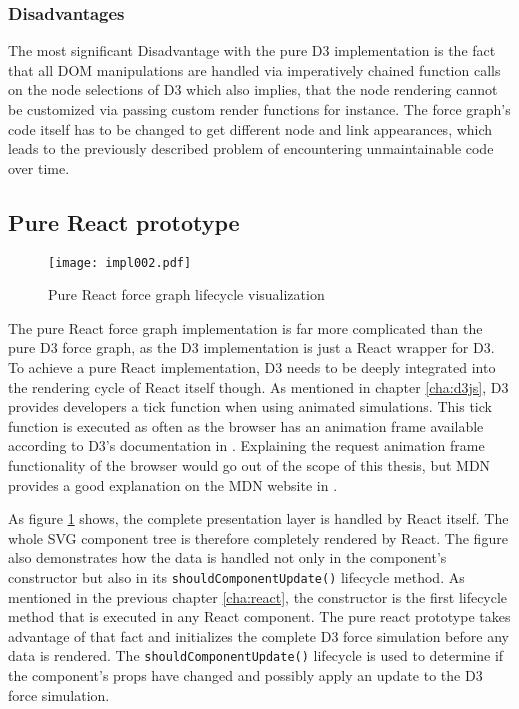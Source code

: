 \subsubsection{Disadvantages}

The most significant Disadvantage with the pure D3 implementation is the fact that all DOM manipulations are handled via imperatively chained function calls on the node selections of D3 which also implies, that the node rendering cannot be customized via passing custom render functions for instance. The force graph's code itself has to be changed to get different node and link appearances, which leads to the previously described problem of encountering unmaintainable code over time.


\subsection{Pure React prototype}

\begin{figure}
\centering
\texttt{[image: impl002.pdf]}
\caption{Pure React force graph lifecycle visualization}
\label{fig:pureReactLifecycle}
\end{figure}

The pure React force graph implementation is far more complicated than the pure D3 force graph, as the D3 implementation is just a React wrapper for D3. To achieve a pure React implementation, D3 needs to be deeply integrated into the rendering cycle of React itself though. As mentioned in chapter \ref{cha:d3js}, D3 provides developers a tick function when using animated simulations. This tick function is executed as often as the browser has an animation frame available according to D3's documentation in \cite[/d3-timer/blob/master/README.md]{D3Github}. Explaining the request animation frame functionality of the browser would go out of the scope of this thesis, but MDN provides a good explanation on the MDN website in \cite{RAF}.

As figure \ref{fig:pureReactLifecycle} shows, the complete presentation layer is handled by React itself. The whole SVG component tree is therefore completely rendered by React. The figure also demonstrates how the data is handled not only in the component's constructor but also in its \texttt{shouldComponentUpdate()} lifecycle method. As mentioned in the previous chapter \ref{cha:react}, the constructor is the first lifecycle method that is executed in any React component. The pure react prototype takes advantage of that fact and initializes the complete D3 force simulation before any data is rendered. The \texttt{shouldComponentUpdate()} lifecycle is used to determine if the component's props have changed and possibly apply an update to the D3 force simulation.


